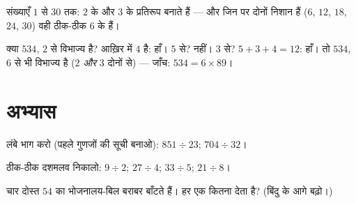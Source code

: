\begin{omfigure}

{\small संख्याएँ $1$ से $30$ तक: $2$ के और $3$ के 
प्रतिरूप बनाते हैं --- और जिन पर दोनों निशान हैं ($6$, $12$, $18$,
$24$, $30$) वही ठीक-ठीक $6$ के  हैं।}
\end{omfigure}

\begin{example}\label{ex:g5:division:criteria}
क्या $534$, $2$ से विभाज्य है? आख़िर में $4$ है: हाँ। $5$ से?
नहीं। $3$ से? $5 + 3 + 4 = 12$: हाँ। तो $534$, $6$ से भी
विभाज्य है ($2$ \emph{और} $3$ दोनों से) --- जाँच: $534 = 6 \times 89$।
\end{example}

\section{अभ्यास}

\begin{exercise}[$\star$]\label{exo:g5:division:1}
लंबे भाग करो (पहले गुणजों की सूची बनाओ):
$851 \div 23$; \quad $704 \div 32$।
\end{exercise}

\begin{exercise}[$\star$]\label{exo:g5:division:2}
ठीक-ठीक दशमलव  निकालो: $9 \div 2$; \quad $27 \div 4$;
\quad $33 \div 5$; \quad $21 \div 8$।
\end{exercise}

\begin{exercise}[$\star$]\label{exo:g5:division:3}
चार दोस्त $54$ का भोजनालय-बिल बराबर बाँटते हैं। हर एक कितना
देता है? (बिंदु के आगे बढ़ो।)
\end{exercise}

